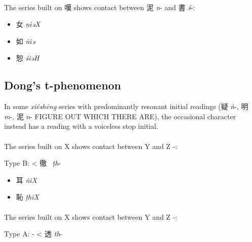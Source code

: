 \paragraph{}
The series built on 嘆 
shows contact between 泥 \textit{n}- and  書
 \emph{ś}-:

\begin{itemize}\item
{\Large{女}}  \emph{ṇiəX} %

\item
{\Large{如}}  \emph{ñiə} %

\item
{\Large{恕}}  \emph{śiəH} %
\end{itemize}

\subsection{Dong's t-phenomenon}
In some
 \emph{xiéshēng} series with predominantly resonant initial
readings (疑 \textit{ṅ}-, 明 \textit{m}-,  泥 \textit{n}- FIGURE OUT WHICH THERE ARE), the occasional character instead has a reading with a
voiceless stop initial.

\paragraph{}
The series built on X 
shows contact between Y and Z -:

Type B:  
{}
< 徹~ \emph{ṭh}- 

\begin{itemize}\item
{\Large{耳}}  \emph{ñiX} %

\item
{\Large{恥}}  \emph{ṭhiX} %
\end{itemize}


\paragraph{}
The series built on X 
shows contact between Y and Z -:


Type A:
{}- < 透 \emph{th}-

